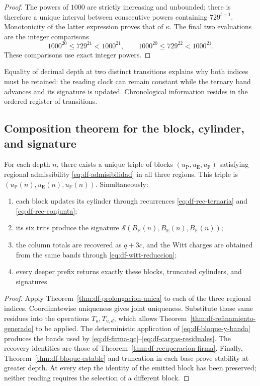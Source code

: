 \begin{proof}
The powers of \(1000\) are strictly increasing and unbounded; there is
therefore a unique interval between consecutive powers containing
\(729^{t+1}\). Monotonicity of the latter expression proves that of
\(\kappa\). The final two evaluations are the integer comparisons
\[
 1000^{20}\leq729^{21}<1000^{21},\qquad
 1000^{20}\leq729^{22}<1000^{21}.
\]
These comparisons use exact integer powers.
\end{proof}

Equality of decimal depth at two distinct transitions explains why both
indices must be retained: the reading clock can remain constant while
the ternary band advances and its signature is updated. Chronological
information resides in the ordered register of transitions.

\subsection{Composition theorem for the block, cylinder, and signature}

\begin{theorem}
\label{thm:df-composicion-conjunta}
For each depth \(n\), there exists a unique triple of blocks
\((u_{\mathrm P},u_{\mathrm E},u_{\mathrm F})\) satisfying regional
admissibility \eqref{eq:df-admisibilidad} in all three regions.
This triple is \((u_{\mathrm P}(n),u_{\mathrm E}(n),u_{\mathrm F}(n))\).
Simultaneously:
\begin{enumerate}
\item each block updates its cylinder through recurrences
\eqref{eq:df-rec-ternaria} and \eqref{eq:df-rec-conjunta};
\item its six trits produce the signature
\(\mathcal S(B_{\mathrm P}(n),B_{\mathrm E}(n),B_{\mathrm F}(n))\);
\item the column totals are recovered as \(q+3c\), and the Witt charges
are obtained from the same bands through
\eqref{eq:df-witt-reduccion};
\item every deeper prefix returns exactly these blocks, truncated
cylinders, and signatures.
\end{enumerate}
\end{theorem}

\begin{proof}
Apply Theorem~\ref{thm:df-prolongacion-unica} to each of the three
regional indices. Coordinatewise uniqueness gives joint uniqueness.
Substitute those same residues into the operations \(T_u,T_{u,d}\),
which allows Theorem~\ref{thm:df-refinamiento-generado} to be applied.
The deterministic application of \eqref{eq:df-bloque-y-banda} produces
the bands used by
\eqref{eq:df-firma-qc}--\eqref{eq:df-cargas-residuales}. The recovery
identities are those of Theorem~\ref{thm:df-recuperacion-firma}.
Finally, Theorem~\ref{thm:df-bloque-estable} and truncation in each base
prove stability at greater depth. At every step the identity of the
emitted block has been preserved; neither reading requires the selection
of a different block.
\end{proof}

